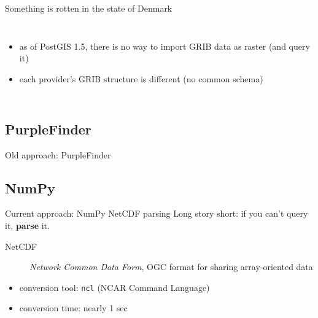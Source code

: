 \documentclass[xcolor=svgnames]{beamer}
\begin{document}
\begin{frame}{Something is rotten in the state of Denmark}
\begin{columns}[c]
{\begin{itemize}
                        \item as of PostGIS 1.5, there is no way to import GRIB data as raster (and query it)
                        \item each provider's GRIB structure is different (no common schema)\\\vspace{0.1\textheight}
                    \end{itemize}
                }
            \end{columns}
        \end{frame}

    \subsection{PurpleFinder}

        \begin{frame}{Old approach: PurpleFinder}
        \end{frame}

    \subsection{NumPy}

        \begin{frame}{Current approach: NumPy NetCDF parsing}
            Long story short: if you can't query it, \textbf{parse} it.
            \pause
            \begin{description}
                \item[NetCDF]\textit{Network Common Data Form}, OGC format for sharing array-oriented data
            \end{description}
            \pause
            \begin{center}
                \resizebox{0.9\textwidth}{!}{%
                    \begin{tikzpicture}
                        
                    \end{tikzpicture}
                }
            \end{center}
            \vfill
            \pause
            \begin{itemize}
                \item conversion tool: \texttt{ncl} (NCAR Command Language)
                \item conversion time: nearly 1 sec
            \end{itemize}
        \end{frame}
\end{document}
